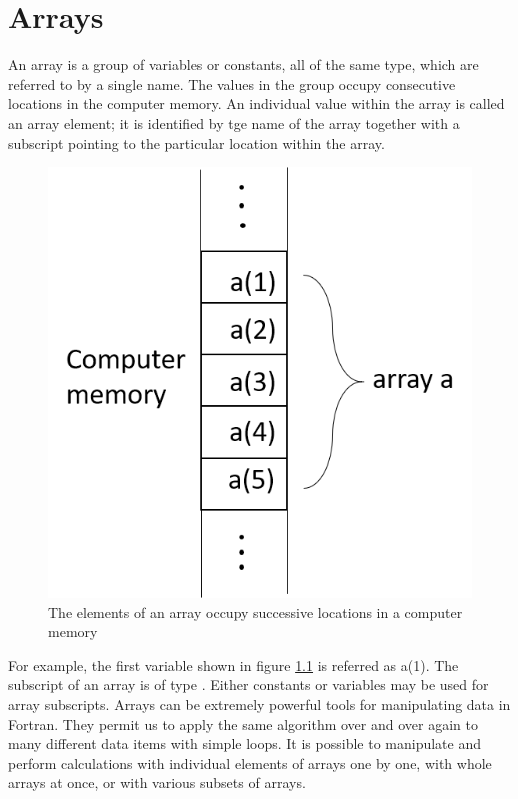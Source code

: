 \documentclass[class=book,crop=false]{standalone}
\begin{document}
\chapter{Arrays}
An array is a group of variables or constants, all of the same type, which are referred to by a single name. The values in the group occupy consecutive locations in the computer memory. An individual value within the array is called an array element; it is identified by tge name of the array together with a subscript pointing to the particular location within the array.
\begin{figure}[H]
    \centering
    \includegraphics[scale=.75]{Picture1.png}
    \caption{The elements of an array occupy successive locations in a computer memory}
    \label{fig:array}
\end{figure}
For example, the first variable shown in figure \ref{fig:array} is referred as a(1). The subscript of an array is of type . Either constants or variables may be used for array subscripts. Arrays can be extremely powerful tools for manipulating data in Fortran. They permit us to apply the same algorithm over and over again to many different data items with simple  loops. It is possible to manipulate and perform calculations with individual elements of arrays one by one, with whole arrays at once, or with various subsets of arrays.\\
\end{document}
